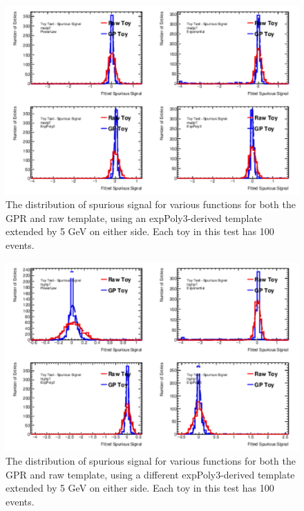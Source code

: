 \begin{figure} 
\begin{center}
  \includegraphics[width=\textwidth]{figures/background/gpr/validation/padded/ToyTest_FitSigVals_medpT_100_noSig}   
\caption{The distribution of spurious signal for various functions for both the GPR and raw template, using an expPoly3-derived template extended by 5 GeV on either side. Each toy in this test has 100 events.}
\label{fig:padded_medpt_100_noSig}
\end{center}
\end{figure}

\begin{figure} 
\begin{center}
  \includegraphics[width=\textwidth]{figures/background/gpr/validation/padded/ToyTest_FitSigVals_highpT_100_noSig}   
\caption{The distribution of spurious signal for various functions for both the GPR and raw template, using a different expPoly3-derived template extended by 5 GeV on either side. Each toy in this test has 100 events.}
\label{fig:padded_highpt_100_noSig}
\end{center}
\end{figure}


